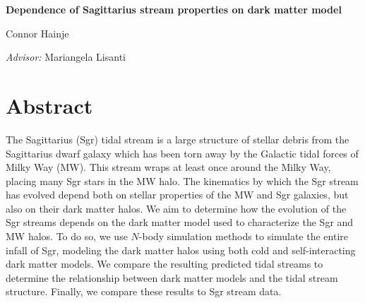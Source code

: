 \documentclass{article}
\begin{document}
{
\centering
\Large \textbf{%
    Dependence of Sagittarius stream properties on dark matter model
} \par
\vspace{12pt}
\normalsize Connor Hainje \par
\vspace{3pt}
\textit{Advisor:} Mariangela Lisanti \par
}


\section*{Abstract}
The Sagittarius (Sgr) tidal stream is a large structure of stellar debris from
the Sagittarius dwarf galaxy which has been torn away by the Galactic tidal
forces of Milky Way (MW). This stream wraps at least once around the Milky Way,
placing many Sgr stars in the MW halo. The kinematics by which the Sgr stream
has evolved depend both on stellar properties of the MW and Sgr galaxies, but
also on their dark matter halos. We aim to determine how the evolution of the
Sgr streams depends on the dark matter model used to characterize the Sgr and MW
halos. To do so, we use $N$-body simulation methods to simulate the entire
infall of Sgr, modeling the dark matter halos using both cold and
self-interacting dark matter models. We compare the resulting predicted tidal
streams to determine the relationship between dark matter models and the tidal
stream structure.  Finally, we compare these results to Sgr stream data.
\end{document}
